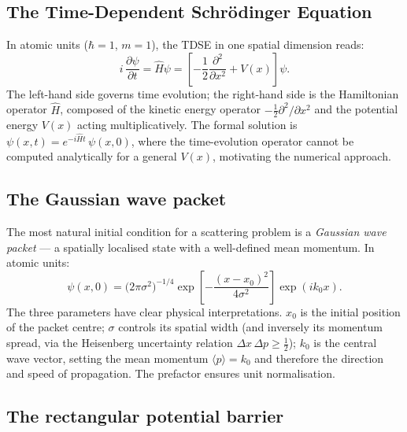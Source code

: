 \documentclass[a4paper,12pt]{article}
\begin{document}
\subsection{The Time-Dependent Schr\"{o}dinger Equation}

In atomic units ($\hbar = 1$, $m = 1$), the TDSE in one spatial dimension reads:
\begin{equation}
  i\,\frac{\partial\psi}{\partial t}
  = \hat{H}\psi
  = \left[-\frac{1}{2}\frac{\partial^2}{\partial x^2} + V(x)\right]\psi.
\end{equation}
The left-hand side governs time evolution; the right-hand side is the
Hamiltonian operator $\hat{H}$, composed of the kinetic energy operator
$-\tfrac{1}{2}\partial^2/\partial x^2$ and the potential energy $V(x)$ acting
multiplicatively.
The formal solution is $\psi(x,t) = e^{-i\hat{H}t}\,\psi(x,0)$, where the
time-evolution operator cannot be computed analytically for a general $V(x)$,
motivating the numerical approach.

\subsection{The Gaussian wave packet}

The most natural initial condition for a scattering problem is a
\emph{Gaussian wave packet} — a spatially localised state with a well-defined
mean momentum.
In atomic units:
\begin{equation}
  \psi(x,0)
  = \bigl(2\pi\sigma^2\bigr)^{-1/4}
    \exp\!\left[-\frac{(x-x_0)^2}{4\sigma^2}\right]
    \exp(ik_0 x).
\end{equation}
The three parameters have clear physical interpretations.
$x_0$ is the initial position of the packet centre;
$\sigma$ controls its spatial width (and inversely its momentum spread, via the
Heisenberg uncertainty relation $\Delta x\,\Delta p \ge \tfrac{1}{2}$);
$k_0$ is the central wave vector, setting the mean momentum $\langle p\rangle = k_0$
and therefore the direction and speed of propagation.
The prefactor ensures unit normalisation.

\subsection{The rectangular potential barrier}
\end{document}
